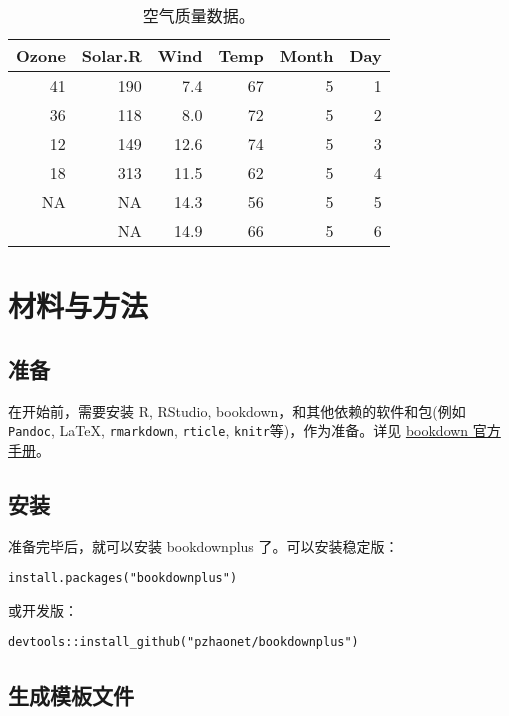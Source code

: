 \documentclass[doublesided]{Style/ucasthesis}%
\begin{document}
\begin{table}[t]

\caption{\label{tab:tabair}空气质量数据。}
\centering
\begin{tabular}{rrrrrr}
\toprule
Ozone & Solar.R & Wind & Temp & Month & Day\\
\midrule
41 & 190 & 7.4 & 67 & 5 & 1\\
36 & 118 & 8.0 & 72 & 5 & 2\\
12 & 149 & 12.6 & 74 & 5 & 3\\
18 & 313 & 11.5 & 62 & 5 & 4\\
NA & NA & 14.3 & 56 & 5 & 5\\
\addlinespace
28 & NA & 14.9 & 66 & 5 & 6\\
\bottomrule
\end{tabular}
\end{table}

\hypertarget{section-1}{%
\chapter{材料与方法}\label{section-1}}

\hypertarget{section-2}{%
\section{准备}\label{section-2}}

在开始前，需要安装 R, RStudio, bookdown，和其他依赖的软件和包(例如 \texttt{Pandoc}, LaTeX, \texttt{rmarkdown}, \texttt{rticle}, \texttt{knitr}等)，作为准备。详见 \href{https://bookdown.org/yihui/bookdown/}{bookdown 官方手册}。

\hypertarget{section-3}{%
\section{安装}\label{section-3}}

准备完毕后，就可以安装 bookdownplus 了。可以安装稳定版：

\begin{verbatim}
install.packages("bookdownplus")
\end{verbatim}

或开发版：

\begin{verbatim}
devtools::install_github("pzhaonet/bookdownplus")
\end{verbatim}

\hypertarget{section-4}{%
\section{生成模板文件}\label{section-4}}
\end{document}
